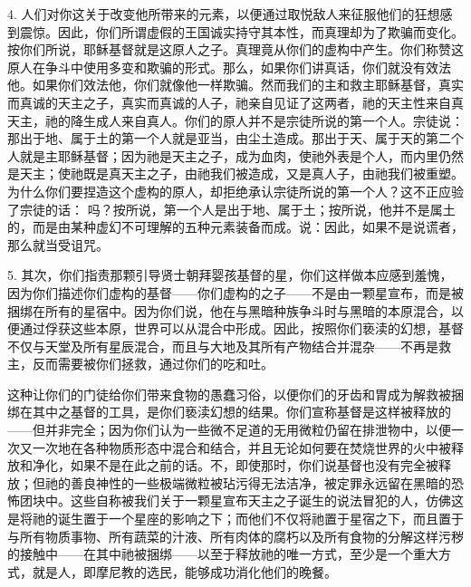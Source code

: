 4. 人们对你这关于改变他所带来的元素，以便通过取悦敌人来征服他们的狂想感到震惊。因此，你们所谓虚假的王国诚实持守其本性，而真理却为了欺骗而变化。按你们所说，耶稣基督就是这原人之子。真理竟从你们的虚构中产生。你们称赞这原人在争斗中使用多变和欺骗的形式。那么，如果你们讲真话，你们就没有效法他。如果你们效法他，你们就像他一样欺骗。然而我们的主和救主耶稣基督，真实而真诚的天主之子，真实而真诚的人子，祂亲自见证了这两者，祂的天主性来自真天主，祂的降生成人来自真人。你们的原人并不是宗徒所说的第一个人。宗徒说： 那出于地、属于土的第一个人就是亚当，由尘土造成。那出于天、属于天的第二个人就是主耶稣基督；因为祂是天主之子，成为血肉，使祂外表是个人，而内里仍然是天主；使祂既是真天主之子，由祂我们被造成，又是真人子，由祂我们被重塑。为什么你们要捏造这个虚构的原人，却拒绝承认宗徒所说的第一个人？这不正应验了宗徒的话： 吗？按所说，第一个人是出于地、属于土；按所说，他并不是属土的，而是由某种虚幻不可理解的五种元素装备而成。说：因此，如果不是说谎者，那么就当受诅咒。\par

5. 其次，你们指责那颗引导贤士朝拜婴孩基督的星，你们这样做本应感到羞愧，因为你们描述你们虚构的基督——你们虚构的之子——不是由一颗星宣布，而是被捆绑在所有的星宿中。因为你们说，他在与黑暗种族争斗时与黑暗的本原混合，以便通过俘获这些本原，世界可以从混合中形成。因此，按照你们亵渎的幻想，基督不仅与天堂及所有星辰混合，而且与大地及其所有产物结合并混杂——不再是救主，反而需要被你们拯救，通过你们的吃和吐。\par

这种让你们的门徒给你们带来食物的愚蠢习俗，以便你们的牙齿和胃成为解救被捆绑在其中之基督的工具，是你们亵渎幻想的结果。你们宣称基督是这样被释放的——但并非完全；因为你们认为一些微不足道的无用微粒仍留在排泄物中，以便一次又一次地在各种物质形态中混合和结合，并且无论如何要在焚烧世界的火中被释放和净化，如果不是在此之前的话。不，即使那时，你们说基督也没有完全被释放；但祂的善良神性的一些极端微粒被玷污得无法洁净，被定罪永远留在黑暗的恐怖团块中。这些自称被我们关于一颗星宣布天主之子诞生的说法冒犯的人，仿佛这是将祂的诞生置于一个星座的影响之下；而他们不仅将祂置于星宿之下，而且置于与所有物质事物、所有蔬菜的汁液、所有肉体的腐朽以及所有食物的分解这样污秽的接触中——在其中祂被捆绑——以至于释放祂的唯一方式，至少是一个重大方式，就是人，即摩尼教的选民，能够成功消化他们的晚餐。\par

